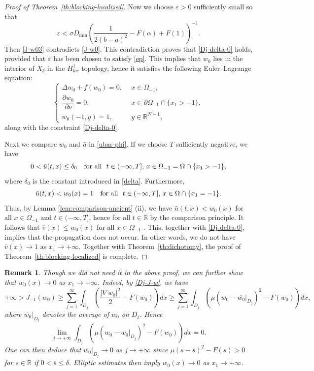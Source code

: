 \documentclass[a4paper,12pt,fullpage]{article}
\numberwithin{equation}{section}
\newtheorem{Rk}[Lemma]{Remark}
\newcommand{\be}{\begin{equation}}
\newcommand{\ee}{\end{equation}}
\def\R{{\mathbb R}}
\def\ep{\varepsilon}
\begin{document}
\begin{proof}[Proof of Theorem~\ref{th:blocking-localized}]
Now we choose $\ep>0$ sufficiently small so that
\begin{equation}\label{ep}
\ep< \sigma D_{\min} \left(\frac{1}{2(b-a)^2}-F(\alpha)+F(1)\right)^{-1}.
\end{equation}
Then \eqref{J-w03} contradicts \eqref{J-w0}. This contradiction proves that \eqref{Dj-delta-0} holds, provided that $\ep$ has been chosen to satisfy \eqref{ep}. This implies that $w_0$ lies in the interior of $X_\delta$ in the $H^1_{loc}$ topology, hence it satisfies the following Euler--Lagrange equation: 
\[
\left\{
\begin{array}{ll}
\Delta w_0 +f(w_0)=0, \ \ & x\in \Omega_{-1},\\[3pt]
\dfrac{\partial w_0}{\partial \nu} = 0, \ \ & x\in \partial\Omega_{-1}\cap\{x_1>-1\},\\[8pt]
w_0(-1,y)=1,\ \ &y\in\R^{N-1},
\end{array}\right.
\]
along with the constraint \eqref{Dj-delta-0}. 

Next we compare $w_0$ and $\bar{u}$ in \eqref{ubar-phi}. If we choose $T$ sufficiently negative, we have
\be\label{barudelta0}
0<\bar{u}(t,x)\leq \delta_0 \quad \hbox{for all}\ \ t\in (-\infty,T],\,x\in\Omega_{-1}=\Omega\cap \{x_1> -1\},
\ee
where $\delta_0$ is the constant introduced in \eqref{delta}. Furthermore,
\be\label{baruw0}
\bar{u}(t,x)<w_0(x)=1 \quad \hbox{for all}\ \ t\in(-\infty,T],\,x\in\Omega\cap \{x_1=-1\}.
\ee
Thus, by Lemma \ref{lem:comparison-ancient} (ii), we have $\bar{u}(t,x)<w_0(x)$ for all $x\in\Omega_{-1}$ and $t\in(-\infty,T]$, hence for all $t\in\R$ by the comparison principle. It follows that $\bar{v}(x)\le w_0(x)$ for all $x\in\Omega_{-1}$ . This, together with \eqref{Dj-delta-0}, implies that the propagation does not occur. In other words, we do not have $\bar{v}(x)\to 1$ as $x_1\to+\infty$.  Together with Theorem~\ref{th:dichotomy}, the proof of Theorem~\ref{th:blocking-localized} is complete.
\end{proof}

\begin{Rk}\label{rk:V-0}
Though we did not need it in the above proof, we can further show that $w_0(x)\to 0$ as $x_1\to+\infty$. Indeed, by \eqref{Dj-J-w}, we have
\[
+\infty>J_{-1}(w_0)\geq \sum_{j=1}^\infty \int_{D_j}\left( \frac{|\nabla w_0|^2}{2}-F(w_0)\right)dx\geq \sum_{j=1}^\infty\int_{D_j}\left(\mu (w_0-\overline{w_0}|_{D_j})^2-F(w_0)\right)dx,
\]
where $\overline{w_0}|_{D_j}$ denotes the average of $w_0$ on $D_j$. Hence
\[
\lim_{j\to+\infty} \int_{D_j}\left(\mu (w_0-\overline{w_0}|_{D_j})^2-F(w_0)\right)dx=0.
\] 
One can then deduce that $\overline{w_0}|_{D_j}\to 0$ as $j\to+\infty$ since $\mu(s-\bar s)^2-F(s)>0$ for $s\in\R$ if $0<\bar s\leq \delta$. Elliptic estimates then imply $w_0(x)\to 0$ as $x_1\to+\infty$.
\end{Rk}
\end{document}
